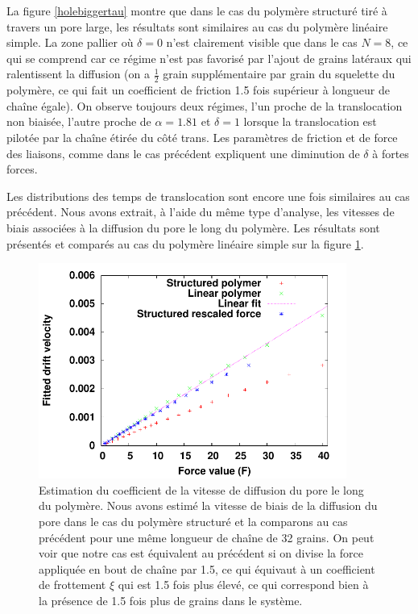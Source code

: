 La figure \ref{holebiggertau} montre que dans le cas du polymère structuré tiré à travers un pore large, les résultats sont similaires au cas du polymère linéaire simple. La zone pallier où $\delta=0$ n'est clairement visible que dans le cas $N=8$, ce qui se comprend car ce régime n'est pas favorisé par l'ajout de grains latéraux qui ralentissent la diffusion (on a $\frac{1}{2}$ grain supplémentaire par grain du squelette du polymère, ce qui fait un coefficient de friction 1.5 fois supérieur à longueur de chaîne égale). On observe toujours deux régimes, l'un proche de la translocation non biaisée, l'autre proche de $\alpha= 1.81$ et $\delta=1$ lorsque la translocation est pilotée par la chaîne étirée du côté trans. Les paramètres de friction et de force des liaisons, comme dans le cas précédent expliquent une diminution de $\delta$ à fortes forces.

Les distributions des temps de translocation sont encore une fois similaires au cas précédent. Nous avons extrait, à l'aide du même type d'analyse, les vitesses de biais associées à la diffusion du pore le long du polymère. Les résultats sont présentés et comparés au cas du polymère linéaire simple sur la figure \ref{frictionholebigger}.


\begin{figure}[H]
\begin{center}

\includegraphics[width=0.9\textwidth]{largeporesfirction.pdf}

\caption[Friction et translocation pour polymère structuré avec un pore large]{Estimation du coefficient de la vitesse de diffusion du pore le long du polymère. Nous avons estimé la vitesse de biais de la diffusion du pore dans le cas du polymère structuré et la comparons au cas précédent pour une même longueur de chaîne de 32 grains. On peut voir que notre cas est équivalent au précédent si on divise la force appliquée en bout de chaîne par 1.5, ce qui équivaut à un coefficient de frottement $\xi$ qui est 1.5 fois plus élevé, ce qui correspond bien à la présence de 1.5 fois plus de grains dans le système.}
\label{frictionholebigger}
\end{center}
\end{figure}

